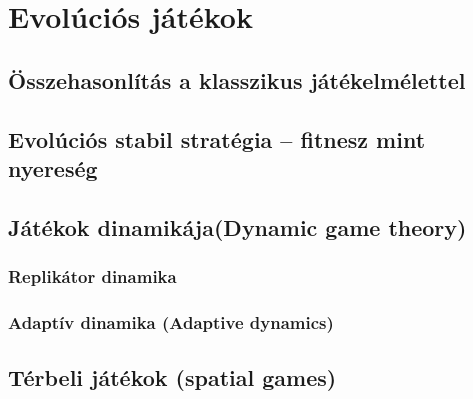 \section{Evolúciós játékok}


\subsection{Összehasonlítás a klasszikus játékelmélettel}
\subsection{Evolúciós stabil stratégia -- fitnesz mint nyereség}
\subsection{Játékok dinamikája(Dynamic game theory)}
\subsubsection{Replikátor dinamika}
\subsubsection{Adaptív dinamika (Adaptive dynamics)}
\subsection{Térbeli játékok (spatial games)}

